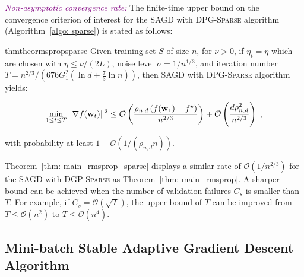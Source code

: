 \documentclass[11pt]{article}
\begin{document}
\textcolor{purple}{\textit{Non-asymptotic convergence rate:}}
The finite-time upper bound on the convergence criterion of interest for the \textsc{SAGD} with \textsc{DPG-Sparse} algorithm (Algorithm~\ref{algo: sparse}) is stated as follows:
\begin{restatable}{thm}{theormspropsparse}
\label{thm: main_rmsprop_sparse}
 Given training set $S$ of size $n$, for $\nu >0$, if $\eta_t = \eta$ which are chosen with $\eta \leq \nu/(2L)$, noise level $\sigma = 1/n^{1/3}$, and iteration number $T = n^{2/3}/\left(676G_1^2(\ln d + \frac{7}{3}\ln n)\right)$, then \textsc{SAGD} with \textsc{DPG-Sparse} algorithm yields:
  \begin{small}
\begin{equation*}
 \min_{1\leq t\leq T}\|\nabla f(\mathbf{w}_t)\|^2 \leq
\mathcal{O} \left( \frac{\rho_{n,d} \left(f(\mathbf{w}_1) - f^\star \right)}{n^{2/3}} \right) +\mathcal{O} \left( \frac{d \rho_{n,d}^2}{n^{2/3}}\right)~,
\end{equation*}
\end{small}
with probability at least $1-\mathcal{O} \left(1/(\rho_{n,d} n)\right)$.
\end{restatable} 
Theorem~\ref{thm: main_rmsprop_sparse} displays a similar rate of $\mathcal{O}(1/n^{2/3})$ for the \textsc{SAGD} with \textsc{DGP-Sparse} as Theorem~\ref{thm: main_rmsprop}. 
A sharper bound can be achieved when the number of validation failures $C_{s}$ is smaller than $T$. 
For example, if $C_{s} = \mathcal{O}(\sqrt{T})$, the upper bound of $T$ can be improved from $T \leq \mathcal{O}(n^2)$ to $T \leq \mathcal{O}(n^4)$.



\subsection{Mini-batch Stable Adaptive Gradient Descent Algorithm}
\label{mini-batch algorithm}
\end{document}
